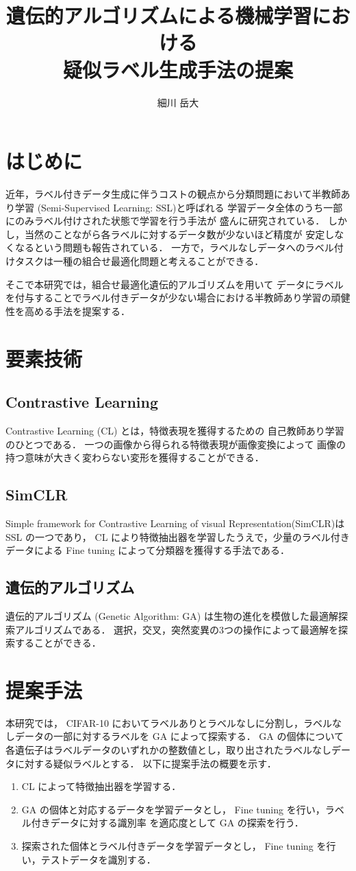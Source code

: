 \documentclass[a4paper,twoside,twocolumn,10pt]{jarticle}     %
\title{遺伝的アルゴリズムによる機械学習における\\疑似ラベル生成手法の提案}
\author{細川 岳大}
\begin{document}
\maketitle
\small
\section{はじめに}
近年，ラベル付きデータ生成に伴うコストの観点から分類問題において半教師あり学習
 (Semi-Supervised Learning: SSL)と呼ばれる
学習データ全体のうち一部にのみラベル付けされた状態で学習を行う手法が
盛んに研究されている．
しかし，当然のことながら各ラベルに対するデータ数が少ないほど精度が
安定しなくなるという問題も報告されている．
一方で，ラベルなしデータへのラベル付けタスクは一種の組合せ最適化問題と考えることができる．

そこで本研究では，組合せ最適化遺伝的アルゴリズムを用いて
データにラベルを付与することでラベル付きデータが少ない場合における半教師あり学習の頑健
性を高める手法を提案する．
\section{要素技術}
\subsection{Contrastive Learning}
Contrastive Learning (CL) とは，特徴表現を獲得するための
自己教師あり学習のひとつである．
一つの画像から得られる特徴表現が画像変換によって
画像の持つ意味が大きく変わらない変形を獲得することができる．
\subsection{SimCLR}
Simple framework for Contrastive Learning of visual Representation(SimCLR)\cite{chen2020simple}は SSL の一つであり，
 CL により特徴抽出器を学習したうえで，少量のラベル付きデータによる Fine tuning によって分類器を獲得する手法である．

\subsection{遺伝的アルゴリズム}
遺伝的アルゴリズム (Genetic Algorithm: GA) は生物の進化を模倣した最適解探索アルゴリズムである．
選択，交叉，突然変異の3つの操作によって最適解を探索することができる．
\section{提案手法}
本研究では， CIFAR-10 においてラベルありとラベルなしに分割し，ラベルなしデータの一部に対するラベルを GA によって探索する．
GA の個体について各遺伝子はラベルデータのいずれかの整数値とし，取り出されたラベルなしデータに対する疑似ラベルとする．
以下に提案手法の概要を示す．
\begin{enumerate}
	\item CL によって特徴抽出器を学習する．
	\item GA の個体と対応するデータを学習データとし， Fine tuning を行い，ラベル付きデータに対する識別率
	を適応度として GA の探索を行う．
	\item 探索された個体とラベル付きデータを学習データとし， Fine tuning を行い，テストデータを識別する．
\end{enumerate}
\end{document}
